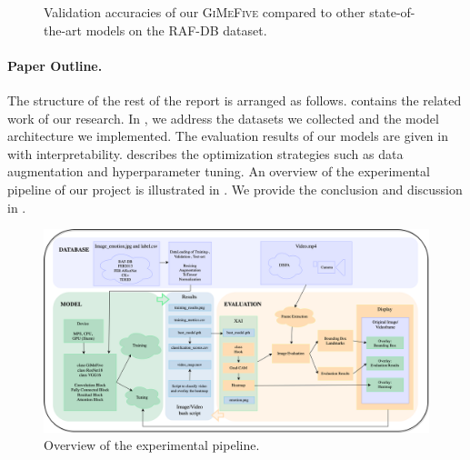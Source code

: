 \begin{figure}[ht]
  \centering
  \caption{Validation accuracies of our \textsc{GiMeFive} compared to other state-of-the-art models on the RAF-DB dataset.} 
  \label{fig:acc}
\end{figure}

\paragraph{Paper Outline.}
The structure of the rest of the report is arranged as follows. 
 contains the related work of our research. 
In , 
we address the datasets we collected and the model architecture we implemented. 
The evaluation results of our models are given in  with interpretability. 
 describes the optimization strategies such as data augmentation and hyperparameter tuning. 
An overview of the experimental pipeline of our project is illustrated in . 
We provide the conclusion and discussion in . 

\begin{figure}[ht]
  \centering
   \includegraphics[width=\linewidth]{pipeline.png}
   \caption{Overview of the experimental pipeline.} 
   \label{fig:pipeline}
\end{figure}

